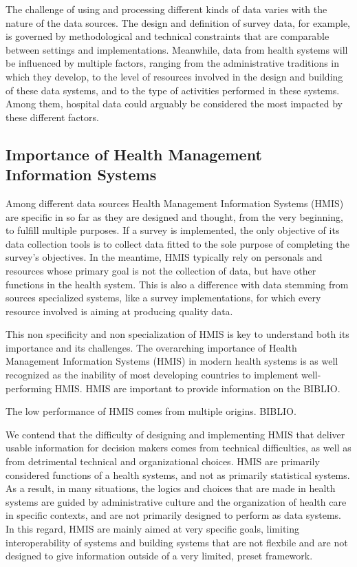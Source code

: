 \documentclass[a4paper,11pt,final,twoside]{article}
\begin{document}
The challenge of using and processing different kinds of data varies with the nature of the data sources. The design and definition of survey data, for example, is governed by methodological and technical constraints that are comparable between settings and implementations. Meanwhile, data from health systems will be influenced by multiple factors, ranging from the administrative traditions in which they develop, to the level of resources involved in the design and building of these data systems, and to the type of activities performed in these systems. Among them, hospital data could arguably be considered the most impacted by these different factors.

\subsection{Importance of Health Management Information Systems}

Among different data sources Health Management Information Systems (HMIS) are specific in so far as they are designed and thought, from the very beginning, to fulfill multiple purposes. If a survey is implemented, the only objective of its data collection tools is to collect data fitted to the sole purpose of completing the survey's objectives. In the meantime, HMIS typically rely on personals and resources whose primary goal is not the collection of data, but have other functions in the health system. This is also a difference with data stemming from sources specialized systems, like a survey implementations, for which every resource involved is aiming at producing quality data.

This non specificity and non specialization of HMIS is key to understand both its importance and its challenges. The overarching importance of Health Management Information Systems (HMIS) in modern health systems\cite{foundph} is as well recognized as the inability of most developing countries to implement well-performing HMIS. HMIS are important to provide information on the BIBLIO.

The low performance of HMIS comes from multiple origins. BIBLIO.

We contend that the difficulty of designing and implementing HMIS that deliver usable information for decision makers comes from technical difficulties, as well as from detrimental technical and organizational choices. HMIS are primarily considered functions of a health systems, and not as primarily statistical systems. As a result, in many situations, the logics and choices that are made in health systems are guided by administrative culture and the organization of health care in specific contexts, and are not primarily designed to perform as data systems. In this regard, HMIS are mainly aimed at very specific goals, limiting interoperability of systems and building systems that are not flexbile and are not designed to give information outside of a very limited, preset framework.
\end{document}

